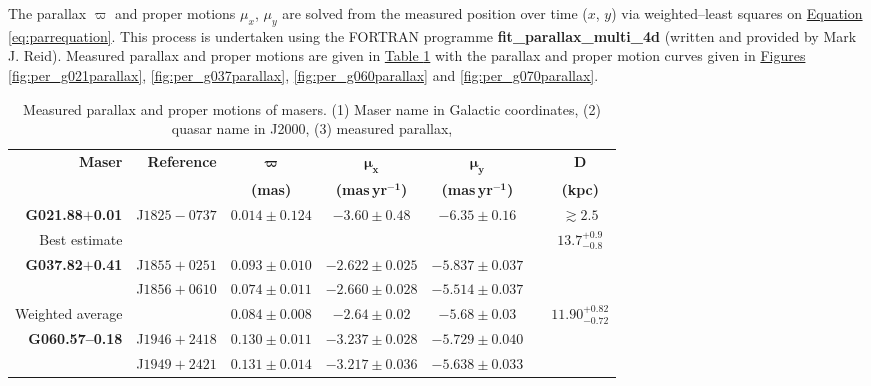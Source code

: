 	        The parallax $\varpi$ and proper motions $\mu_x$, $\mu_y$ are solved from the measured position over time ($x$, $y$) via weighted--least squares on \hyperref[eq:parrequation]{Equation \ref*{eq:parrequation}}. This process is undertaken using the FORTRAN programme \textbf{fit\_parallax\_multi\_4d} (written and provided by Mark J. Reid). Measured parallax and proper motions are given in \hyperref[tab:br210_parallax]{Table \ref*{tab:br210_parallax}} with the parallax and proper motion curves given in \hyperref[fig:per_g021parallax]{Figures \ref*{fig:per_g021parallax}}, \hyperref[fig:per_g037parallax]{\ref*{fig:per_g037parallax}}, \hyperref[fig:per_g060parallax]{\ref*{fig:per_g060parallax}} and \hyperref[fig:per_g070parallax]{\ref*{fig:per_g070parallax}}.
	        \begin{table}[h]
	        	\onehalfspacing
	        	\footnotesize
	        	\centering
	        	\caption[Parallax and Proper Motions]{Measured parallax and proper motions of masers. (1) Maser name in Galactic coordinates, (2) quasar name in J2000, (3) measured parallax, }
	        	\label{tab:br210_parallax}
	        	\begin{tabular}{rrccccc}
	        		\toprule
	        		\textbf{Maser}&\textbf{Reference}&$\boldsymbol{\varpi}$&$\boldsymbol{\mu_x}$&$\boldsymbol{\mu_y}$&&$\boldsymbol{D}$\\
	        		&&{\bf(mas)}&{\bf(mas\,yr$\boldsymbol{^{-1}}$)}&{\bf(mas\,yr$\boldsymbol{^{-1}}$)}&&{\bf(kpc)}\\
	        		\midrule
	        		\textbf{G021.88$+$0.01} &J$1825-0737$      &  $0.014\pm0.124$ & $-3.60\pm0.48$ & $-6.35\pm0.16$ &  & $\gtrsim2.5$ \\
	        		Best estimate& 				   & 				  & 			   & 			    & & $13.7^{+0.9}_{-0.8}$ \\\hline 
	        		\textbf{G037.82$+$0.41}  &J$1855+0251$      &  $0.093\pm0.010$ & $-2.622\pm0.025$ & $-5.837\pm0.037$ &  &  \\
	        		&J$1856+0610$      &  $0.074\pm0.011$ & $-2.660\pm0.028$ & $-5.514\pm0.037$ &  &  \\
	        		Weighted average&           &  $0.084\pm0.008$ & $-2.64 \pm0.02 $ & $-5.68 \pm0.03$  &  & $11.90^{+0.82}_{-0.72}$ \\\hline
	        		\textbf{G060.57--0.18}  &J$1946+2418$      &  $0.130\pm0.011$ & $-3.237\pm0.028$ & $-5.729\pm0.040$ &  &  \\
	        		&J$1949+2421$      &  $0.131\pm0.014$ & $-3.217\pm0.036$ & $-5.638\pm0.033$ &  &  \\

\end{tabular}
\end{table}
